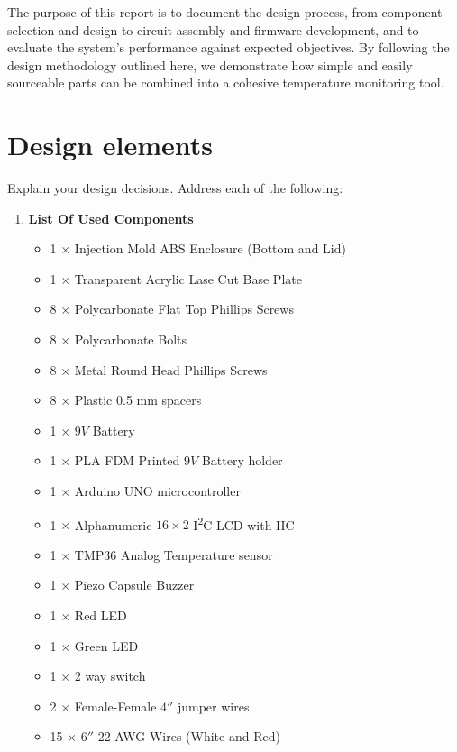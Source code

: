\documentclass[10pt]{article}
\begin{document}
The purpose of this report is to document the design process, from component
selection and design to circuit assembly and firmware development, and
to evaluate the system's performance against expected objectives. By following
the design methodology outlined here, we demonstrate how simple and
easily sourceable parts can be combined into a cohesive temperature
monitoring tool.


\section{Design elements} Explain your design decisions. Address each of the
following:

\begin{enumerate}[label=\Alph*.]
	\item \textbf{List Of Used Components}
	      \begin{multicols}{2}
		      \begin{itemize}
			      \item 1 $\times$ Injection Mold ABS Enclosure (Bottom and Lid)
			      \item 1 $\times$ Transparent Acrylic Lase Cut Base Plate
			      \item 8 $\times$ Polycarbonate Flat Top Phillips Screws
			      \item 8 $\times$ Polycarbonate Bolts
			      \item 8 $\times$ Metal Round Head Phillips Screws
			      \item 8 $\times$ Plastic 0.5 mm spacers
			      \item 1 $\times$ $9 V$ Battery
			      \item 1 $\times$ PLA FDM Printed $9 V$ Battery holder
			      \item 1 $\times$ Arduino UNO microcontroller
			      \item 1 $\times$ Alphanumeric $16 \times 2$ I\textsuperscript{2}C LCD with IIC
			      \item 1 $\times$ TMP36 Analog Temperature sensor
			      \item 1 $\times$ Piezo Capsule Buzzer
			      \item 1 $\times$ Red LED
			      \item 1 $\times$ Green LED
			      \item 1 $\times$ 2 way switch
			      \item 2 $\times$ Female-Female $4''$ jumper wires
			      \item 15 $\times$ $6''$ 22 AWG Wires (White and Red)

\end{itemize}
\end{multicols}
\end{enumerate}
\end{document}

